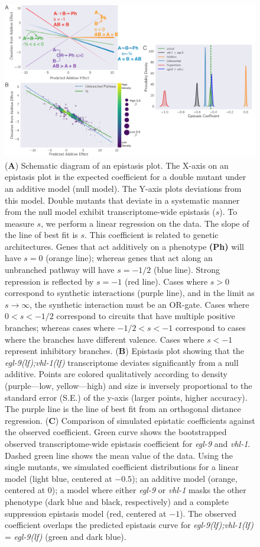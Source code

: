 \documentclass[10pt, onecolumn]{article}
\newcommand{\gene}[1]{\emph{#1}}
\newcommand{\egl}{\emph{\mbox{egl-9}(lf)}}
\newcommand{\eglvhl}{\emph{\mbox{egl-9(lf);vhl-1(lf)}}}
\begin{document}
\begin{figure}[tbhp]
\centering
\includegraphics[width=\linewidth]{../figs/egl9hif1-epistasis-horizontal.pdf}
\caption{
(\textbf{A}) Schematic diagram of an epistasis plot. The X-axis on an epistasis
plot is the expected coefficient for a double mutant under an additive model
(null model). The Y-axis plots deviations from this model. Double mutants that
deviate in a systematic manner from the null model exhibit transcriptome-wide epistasis
($s$). To measure $s$, we perform a linear regression on the data. The slope of
the line of best fit is $s$. This coefficient is related to genetic architectures.
Genes that act additively on a phenotype \textbf{(Ph)} will have $s=0$ (orange
line); whereas
genes that act along an unbranched pathway will have $s=-1/2$ (blue line).
Strong
repression is reflected by $s=-1$ (red line). Cases where $s>0$ correspond to
synthetic interactions (purple line), and in the limit as $s\rightarrow\infty$,
the synthetic interaction
must be an OR-gate. Cases where $0 < s < -1/2$ correspond to circuits
that have multiple positive branches; whereas cases where
$-1/2<s< -1$ correspond to cases where the branches have different valence.
Cases where $s < -1$ represent inhibitory branches.
(\textbf{B}) Epistasis plot showing
that the \eglvhl{} transcriptome deviates significantly from a null additive.
Points are colored qualitatively according to density (purple---low,
yellow---high) and size is inversely proportional to the standard
error (S.E.) of the y-axis (larger points, higher accuracy). The purple line
is the line of best fit from an orthogonal distance regression.
(\textbf{C}) Comparison of simulated epistatic coefficients against the observed
coefficient. Green curve shows the bootstrapped observed transcriptome-wide epistasis
coefficient for \gene{egl-9} and \gene{vhl-1}. Dashed green line shows the mean
value of the data. Using the single mutants, we simulated coefficient
distributions for a linear model (light blue, centered at $-0.5$);
an additive model (orange, centered at 0); a model where either
\gene{egl-9} or \gene{vhl-1} masks the other phenotype (dark blue and black,
respectively) and a complete suppression epistasis model (red, centered at $-1$).
The observed coefficient overlaps the predicted epistasis curve for
\eglvhl{} = \egl{} (green and dark blue).
}
\label{fig:egl9epistasis}
\end{figure}
\end{document}
